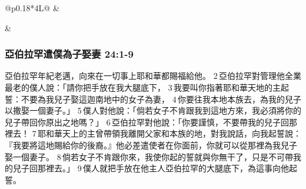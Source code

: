 \begin{table}[H]
\begin{threeparttable}
\begin{tabular}{@{}p{}*{4}{L{\tabcolsep\relax}}@{}}
& \\\hline

& \\\hline
\end{tabular}
\label{table:QiuDi}
\end{threeparttable}
\end{table}

\subsubsection{亞伯拉罕遣僕為子娶妻 24:1-9}
亞伯拉罕年紀老邁，向來在一切事上耶和華都賜福給他。 2 亞伯拉罕對管理他全業最老的僕人說：「請你把手放在我大腿底下， 3 我要叫你指著耶和華天地的主起誓：不要為我兒子娶這迦南地中的女子為妻， 4 你要往我本地本族去，為我的兒子以撒娶一個妻子。」 5 僕人對他說：「倘若女子不肯跟我到這地方來，我必須將你的兒子帶回你原出之地嗎？」 6 亞伯拉罕對他說：「你要謹慎，不要帶我的兒子回那裡去！ 7 耶和華天上的主曾帶領我離開父家和本族的地，對我說話，向我起誓說：『我要將這地賜給你的後裔。』他必差遣使者在你面前，你就可以從那裡為我兒子娶一個妻子。 8 倘若女子不肯跟你來，我使你起的誓就與你無干了，只是不可帶我的兒子回那裡去。」 9 僕人就把手放在他主人亞伯拉罕的大腿底下，為這事向他起誓。


